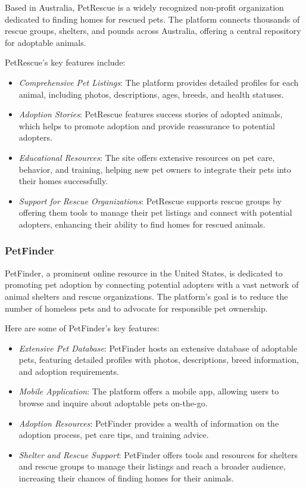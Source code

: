 Based in Australia, PetRescue is a widely recognized non-profit organization dedicated to finding homes for rescued pets. The platform connects thousands of rescue groups, shelters, and pounds across Australia, offering a central repository for adoptable animals.

PetRescue's key features include:

\begin{itemize}
  \item \textit{Comprehensive Pet Listings}: The platform provides detailed profiles for each animal, including photos, descriptions, ages, breeds, and health statuses.
  \item \textit{Adoption Stories}: PetRescue features success stories of adopted animals, which helps to promote adoption and provide reassurance to potential adopters.
  \item \textit{Educational Resources}: The site offers extensive resources on pet care, behavior, and training, helping new pet owners to integrate their pets into their homes successfully.
  \item \textit{Support for Rescue Organizations}: PetRescue supports rescue groups by offering them tools to manage their pet listings and connect with potential adopters, enhancing their ability to find homes for rescued animals.
\end{itemize}


\subsubsection*{PetFinder}

PetFinder, a prominent online resource in the United States, is dedicated to promoting pet adoption by connecting potential adopters with a vast network of animal shelters and rescue organizations. The platform's goal is to reduce the number of homeless pets and to advocate for responsible pet ownership.

Here are some of PetFinder's key features:

\begin{itemize}
  \item \textit{Extensive Pet Database}: PetFinder hosts an extensive database of adoptable pets, featuring detailed profiles with photos, descriptions, breed information, and adoption requirements.
  \item \textit{Mobile Application}: The platform offers a mobile app, allowing users to browse and inquire about adoptable pets on-the-go.
  \item \textit{Adoption Resources}: PetFinder provides a wealth of information on the adoption process, pet care tips, and training advice.
  \item \textit{Shelter and Rescue Support}: PetFinder offers tools and resources for shelters and rescue groups to manage their listings and reach a broader audience, increasing their chances of finding homes for their animals.
\end{itemize}

